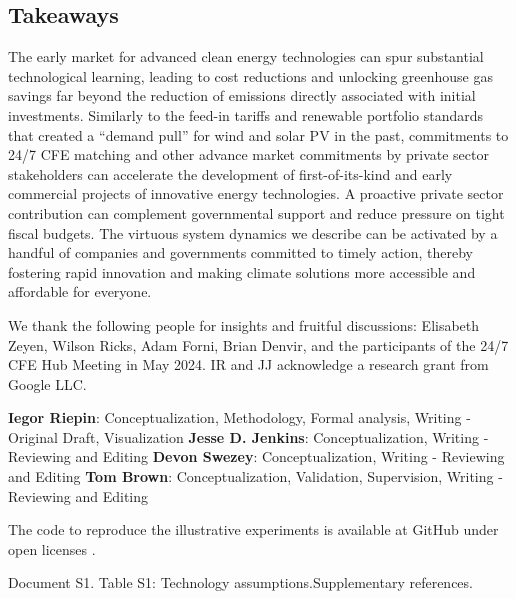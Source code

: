 \documentclass[pdflatex,sn-basic, Numbered]{sn-jnl}
\theoremstyle{thmstyleone}%
\theoremstyle{thmstyletwo}%
\theoremstyle{thmstylethree}%
\begin{document}
\subsection*{Takeaways}\label{sec6}

The early market for advanced clean energy technologies can spur substantial technological learning, leading to cost reductions and unlocking greenhouse gas savings far beyond the reduction of emissions directly associated with initial investments.
Similarly to the feed-in tariffs and renewable portfolio standards that created a \enquote{demand pull} for wind and solar PV in the past, commitments to 24/7 CFE matching and other advance market commitments \cite{GoogleMicrosoftNucor} by private sector stakeholders can accelerate the development of first-of-its-kind and early commercial projects of innovative energy technologies.
A proactive private sector contribution can complement governmental support and reduce pressure on tight fiscal budgets.
The virtuous system dynamics we describe can be activated by a handful of companies and governments committed to timely action, thereby fostering rapid innovation and making climate solutions more accessible and affordable for everyone.

\backmatter

 We thank the following people for insights and fruitful discussions: Elisabeth Zeyen, Wilson Ricks, Adam Forni, Brian Denvir, and the participants of the 24/7 CFE Hub Meeting in May 2024. IR and JJ acknowledge a research grant from Google LLC.

\textbf{Iegor Riepin}: Conceptualization, Methodology, Formal analysis, Writing - Original Draft, Visualization
\textbf{Jesse D. Jenkins}: Conceptualization, Writing - Reviewing and Editing
\textbf{Devon Swezey}: Conceptualization, Writing - Reviewing and Editing
\textbf{Tom Brown}: Conceptualization, Validation, Supervision, Writing - Reviewing and Editing

 The code to reproduce the illustrative experiments is available at GitHub under open licenses \cite{code247CFE}.

 Document S1. Table S1: Technology assumptions.Supplementary references.

\end{document}
